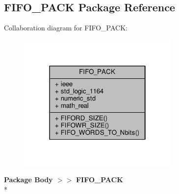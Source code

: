 \subsection{F\+I\+F\+O\+\_\+\+P\+A\+CK Package Reference}
\label{classFIFO__PACK}


Collaboration diagram for F\+I\+F\+O\+\_\+\+P\+A\+CK\+:\nopagebreak
\begin{figure}[H]
\begin{center}
\leavevmode
\includegraphics[width=226pt]{d2/d70/classFIFO__PACK__coll__graph}
\end{center}
\end{figure}
{\bfseries Package Body $>$$>$ }{\bf F\+I\+F\+O\+\_\+\+P\+A\+CK}\\*
